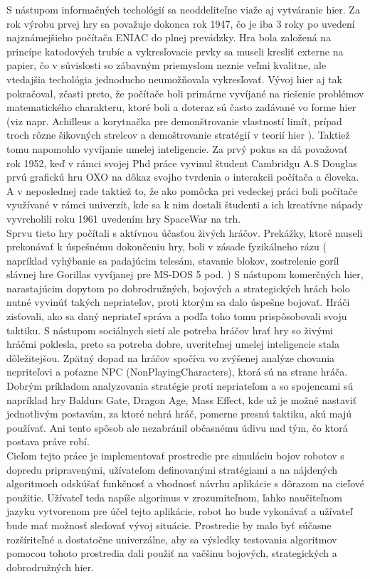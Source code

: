 \indent S nástupom informačných techológií sa neoddeliteľne viaže aj vytváranie hier. Za rok výrobu prvej hry sa považuje dokonca rok 1947, čo je iba 3 roky po uvedení najznámejšieho počítača ENIAC do plnej prevádzky. Hra bola založená na princípe katodových trubíc a vykresľovacie prvky sa museli kresliť externe na papier, čo v súvislosti so zábavným priemyslom neznie veľmi kvalitne, ale vtedajšia techológia jednoducho neumožňovala vykresľovať. Vývoj hier aj tak pokračoval, zčasti preto, že počítače boli primárne vyvíjané na riešenie problémov matematického charakteru, ktoré boli a doteraz sú často zadávané vo forme hier (viz napr. Achilleus a korytnačka pre demonštrovanie vlastností limít, prípad troch rôzne šikovných strelcov a demoštrovanie stratégií v teorií hier ). Taktiež tomu napomohlo vyvíjanie umelej inteligencie. Za prvý pokus sa dá považovať rok 1952, keď v rámci svojej Phd práce vyvinul študent Cambridgu A.S Douglas prvú grafickú hru OXO na dôkaz svojho tvrdenia o interakcii počítača a človeka. A v neposlednej rade taktiež to, že ako pomôcka pri vedeckej práci boli počítače využívané v rámci univerzít, kde sa k nim dostali študenti a ich kreatívne nápady vyvrcholili roku 1961 uvedením hry SpaceWar na trh. \\
\indent Sprvu tieto hry počítali s aktívnou účasťou živých hráčov. Prekážky, ktoré museli prekonávať k úspešnému dokončeniu hry, boli v zásade fyzikálneho rázu ( napríklad vyhýbanie sa padajúcim telesám, stavanie blokov, zostrelenie goríl slávnej hre Gorillas vyvíjanej pre MS-DOS 5 pod. ) S nástupom komerčných hier, narastajúcim dopytom po dobrodružných, bojových a strategických hrách bolo nutné vyvinúť takých nepriateľov, proti ktorým sa dalo úspešne bojovať. Hráči zisťovali, ako sa daný nepriateľ správa a podľa toho tomu prispôsobovali svoju taktiku. S nástupom sociálnych sietí ale potreba hráčov hrať hry so živými hráčmi poklesla, preto sa potreba dobre, uveriteľnej umelej inteligencie stala dôležitejšou. Zpätný dopad na hráčov spočíva vo zvýšenej analýze chovania nepriteľovi a poťazne NPC (NonPlayingCharacters), ktorá sú na strane hráča. Dobrým príkladom analyzovania stratégie proti nepriateľom a so spojencami sú napríklad hry Baldurs Gate, Dragon Age, Mass Effect, kde už je možné nastaviť jednotlivým postavám, za ktoré nehrá hráč, pomerne presnú taktiku, akú majú používať. Ani tento spôsob ale nezabránil občasnému údivu nad tým, čo ktorá postava práve robí. \\
\indent Cieľom tejto práce je implementovať prostredie pre simuláciu bojov robotov s dopredu pripravenými, užívateľom definovanými stratégiami a na nájdených algoritmoch odskúšať funkčnosť a vhodnosť návrhu aplikácie s dôrazom na cieľové použitie. Užívateľ teda napíše algorimus v zrozumiteľnom, ľahko naučiteľnom jazyku vytvorenom pre účel tejto aplikácie, robot ho bude vykonávať a užívateľ bude mať možnosť sledovať vývoj situácie. Prostredie by malo byť súčasne rozšíriteľné a dostatočne univerzálne, aby sa výsledky testovania algoritmov pomocou tohoto prostredia dali použiť na vačšinu bojových, strategických a dobrodružných hier. \\
